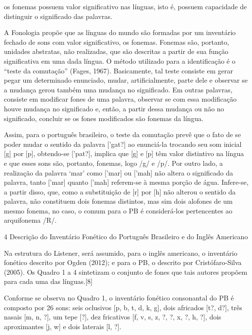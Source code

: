 os fonemas possuem valor significativo nas l\'inguas, isto \'e, possuem
capacidade de distinguir o significado das palavras.

A Fonologia prop\~oe que as l\'inguas do mundo s\~ao formadas por um
invent\'ario fechado de sons com valor significativo, os fonemas. Fonemas
s\~ao, portanto, unidades abstratas, n\~ao realizadas, que s\~ao descritas a
partir de sua fun\c{c}\~ao significativa em uma dada l\'ingua. O m\'etodo
utilizado para a identifica\c{c}\~ao \'e o ``teste da comuta\c{c}\~ao'' (Fages, 1967).
Basicamente, tal teste consiste em gerar pegar um determinado enunciado,
mudar, artificialmente, parte dele e observar se a mudan\c{c}a gerou tamb\'em
uma mudan\c{c}a no significado. Em outras palavras, consiste em modificar
fones de uma palavra, observar se com essa modifica\c{c}\~ao houve mudan\c{c}a no
significado e, ent\~ao, a partir dessa mudan\c{c}a ou n\~ao no significado,
concluir se os fones modificados s\~ao fonemas da l\'ingua.

Assim, para o portugu\^es brasileiro, o teste da comuta\c{c}\~ao prev\^e que o
fato de se poder mudar o sentido da palavra {[}'gat?{]} ao enunci\'a-la
trocando seu som inicial {[}g{]} por {[}p{]}, obtendo-se {[}'pat?{]},
implica que {[}g{]} e {[}p{]} t\^em valor distintivo na l\'ingua e que esses
sons s\~ao, portanto, fonemas, logo /g/ e /p/. Por outro lado, a
realiza\c{c}\~ao da palavra `mar' como {[}'mar{]} ou {[}'mah{]} n\~ao altera o
significado da palavra, tanto {[}'mar{]} quanto {[}'mah{]} referem-se à
mesma por\c{c}\~ao de \'agua. Infere-se, a partir disso, que, como a
substitui\c{c}\~ao de {[}r{]} por {[}h{]} n\~ao alterou o sentido da palavra,
n\~ao constituem dois fonemas distintos, mas sim dois alofones de um mesmo
fonema, no caso, o comum para o PB \'e consider\'a-los pertencentes ao
arquifonema /R/.

4 Descri\c{c}\~ao do Invent\'ario Fon\'etico do Portugu\^es Brasileiro e do Ingl\^es
Americano

Na estrutura do Listener, ser\'a assumido, para o ingl\^es americano, o
invent\'ario fon\'etico descrito por Ogden (2012); e para o PB, o descrito
por Crist\'ofaro-Silva (2005). Os Quadro 1 a 4 sintetizam o conjunto de
fones que tais autores prop\~oem para cada uma das l\'inguas.{[}8{]}



Conforme se observa no Quadro 1, o invent\'ario fon\'etico consonantal do PB
\'e composto por 26 sons: seis oclusivos {[}p, b, t, d, k, g{]}, dois
africados {[}t?, d?{]}, tr\^es nasais {[}m, n, ?{]}, um tepe {[}?{]}, dez
fricativos {[}f, v, s, z, ?, ?, x, ?, h, ?{]}, dois aproximantes {[}j,
w{]} e dois laterais {[}l, ?{]}.

